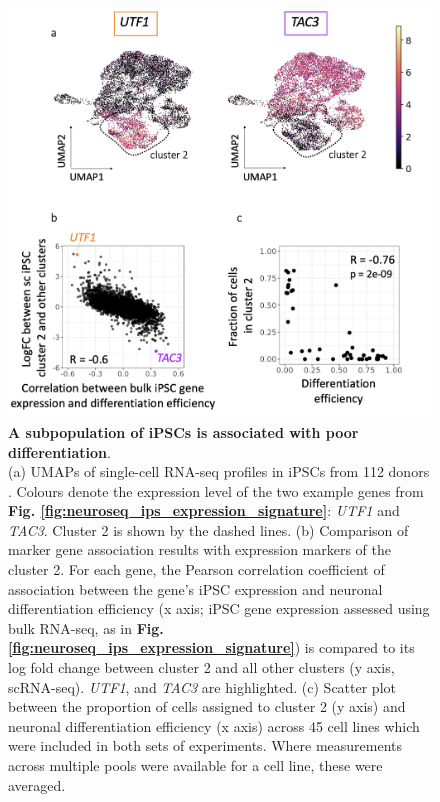 \begin{figure}[htbp]
\centering
\includegraphics[width=14cm]{Chapter5/Fig/neuroseq_ips_sc_genes.png}
\caption[An iPSC subpopulation is linked to poor differentiation]{\textbf{A subpopulation of iPSCs is associated with poor differentiation}.\\
(a) UMAPs of single-cell RNA-seq profiles in iPSCs from 112 donors \cite{cuomo2020single}.
Colours denote the expression level of the two example genes from \textbf{Fig. \ref{fig:neuroseq_ips_expression_signature}}: \textit{UTF1} and \textit{TAC3}. 
Cluster 2 is shown by the dashed lines. 
(b) Comparison of marker gene association results with expression markers of the cluster 2. 
For each gene, the Pearson correlation coefficient of association between the gene's iPSC expression and neuronal differentiation efficiency (x axis; iPSC gene expression assessed using bulk RNA-seq, as in \textbf{Fig. \ref{fig:neuroseq_ips_expression_signature}}) is compared to its log fold change between cluster 2 and all other clusters (y axis, scRNA-seq).
\textit{UTF1}, and \textit{TAC3} are highlighted. 
(c) Scatter plot between the proportion of cells assigned to cluster 2 (y axis) and neuronal differentiation efficiency (x axis) across 45 cell lines which were included in both sets of experiments. 
Where measurements across multiple pools were available for a cell line, these were averaged.}
\label{fig:neuroseq_ips_sc_genes}
\end{figure}


